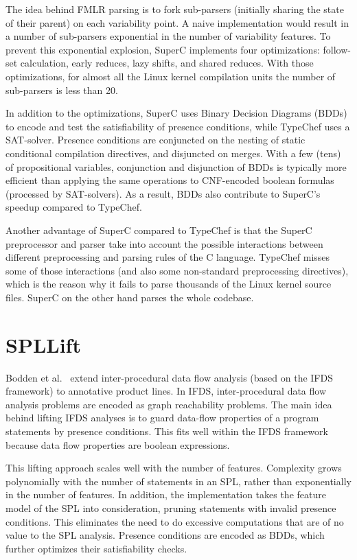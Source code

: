 \documentclass[11pt]{article}
\begin{document}
The idea behind FMLR parsing is to fork sub-parsers (initially sharing the state of their parent) on each variability point. A naive implementation would result in a number of sub-parsers exponential in the number of variability features. To prevent this exponential explosion, SuperC implements four optimizations: follow-set calculation, early reduces, lazy shifts, and shared reduces. With those optimizations, for almost all the Linux kernel compilation units the number of sub-parsers is less than 20.

In addition to the optimizations, SuperC uses Binary Decision Diagrams (BDDs) to encode and test the satisfiability of presence conditions, while TypeChef uses a SAT-solver. Presence conditions are conjuncted on the nesting of static conditional compilation directives, and disjuncted on merges. With a few (tens) of propositional variables, conjunction and disjunction of BDDs is typically more efficient than applying the same operations to CNF-encoded boolean formulas (processed by SAT-solvers). As a result, BDDs also contribute to SuperC's speedup compared to TypeChef.

Another advantage of SuperC compared to TypeChef is that the SuperC preprocessor and parser take into account the possible interactions between different preprocessing and parsing rules of the C language. TypeChef misses some of those interactions (and also some non-standard preprocessing directives), which is the reason why it fails to parse thousands of the Linux kernel source files. SuperC on the other hand parses the whole codebase.

\section{SPLLift}

Bodden et al.~\cite{Bodden:2013} extend inter-procedural data flow analysis (based on the IFDS~\cite{Reps:1995} framework) to annotative product lines. In IFDS, inter-procedural data flow analysis problems are encoded as graph reachability problems. The main idea behind lifting IFDS analyses is to guard data-flow properties of a program statements by presence conditions. This fits well within the IFDS framework because data flow properties are boolean expressions.

This lifting approach scales well with the number of features. Complexity grows polynomially with the number of statements in an SPL, rather than exponentially in the number of features. In addition, the implementation takes the feature model of the SPL into consideration, pruning statements with invalid presence conditions. This eliminates the need to do excessive computations that are of no value to the SPL analysis. Presence conditions are encoded as BDDs, which further optimizes their satisfiability checks.
\end{document}
